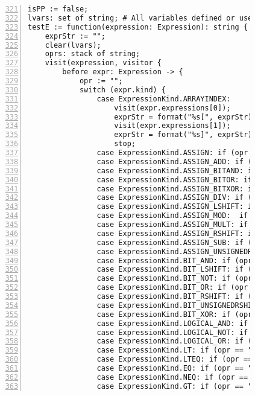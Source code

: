 \begin{figure}[ht!]
\begin{lstlisting}[numbers=left, tabsize=4, escapechar=@, caption={API Usage Mining Analysis},label={lst:aun-code},  firstline = 321, firstnumber = 321, lastline = 381]
isPP := false;
lvars: set of string; # All variables defined or used in a node
testE := function(expression: Expression): string {
    exprStr := "";
    clear(lvars);
    oprs: stack of string;
    visit(expression, visitor {
        before expr: Expression -> {
            opr := "";
            switch (expr.kind) {
                case ExpressionKind.ARRAYINDEX:
                    visit(expr.expressions[0]);
                    exprStr = format("%s[", exprStr);
                    visit(expr.expressions[1]);
                    exprStr = format("%s]", exprStr);
                    stop;
                case ExpressionKind.ASSIGN: if (opr == "") opr = "="; 
                case ExpressionKind.ASSIGN_ADD: if (opr == "") opr = "+="; 
                case ExpressionKind.ASSIGN_BITAND: if (opr == "") opr = "&="; 
                case ExpressionKind.ASSIGN_BITOR: if (opr == "") opr = "|="; 
                case ExpressionKind.ASSIGN_BITXOR: if (opr == "") opr = "^="; 
                case ExpressionKind.ASSIGN_DIV: if (opr == "") opr = "/="; 
                case ExpressionKind.ASSIGN_LSHIFT: if (opr == "") opr = "<<="; 
                case ExpressionKind.ASSIGN_MOD:  if (opr == "") opr = "%="; 
                case ExpressionKind.ASSIGN_MULT: if (opr == "") opr = "*="; 
                case ExpressionKind.ASSIGN_RSHIFT: if (opr == "") opr = ">>="; 
                case ExpressionKind.ASSIGN_SUB: if (opr == "") opr = "-="; 
                case ExpressionKind.ASSIGN_UNSIGNEDRSHIFT: if (opr == "") opr = ">>>="; 
                case ExpressionKind.BIT_AND: if (opr == "") opr = "&"; 
                case ExpressionKind.BIT_LSHIFT: if (opr == "") opr = "<<"; 
                case ExpressionKind.BIT_NOT: if (opr == "") opr = "~"; 
                case ExpressionKind.BIT_OR: if (opr == "") opr = "|"; 
                case ExpressionKind.BIT_RSHIFT: if (opr == "") opr = ">>"; 
                case ExpressionKind.BIT_UNSIGNEDRSHIFT: if (opr == "") opr = ">>>"; 
                case ExpressionKind.BIT_XOR: if (opr == "") opr = "^"; 
                case ExpressionKind.LOGICAL_AND: if (opr == "") opr = "&&"; 
                case ExpressionKind.LOGICAL_NOT: if (opr == "") opr = "!";
                case ExpressionKind.LOGICAL_OR: if (opr == "") opr = "||";
                case ExpressionKind.LT: if (opr == "") opr = "<";
                case ExpressionKind.LTEQ: if (opr == "") opr = "<="; 
                case ExpressionKind.EQ: if (opr == "") opr = "==";
                case ExpressionKind.NEQ: if (opr == "") opr = "!=";
                case ExpressionKind.GT: if (opr == "") opr = ">";

\end{lstlisting}
\end{figure}
